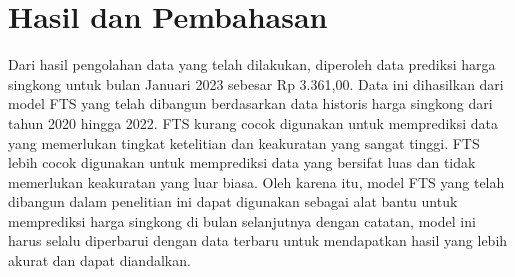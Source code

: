 \documentclass[conference]{IEEEtran}
\begin{document}
\section{Hasil dan Pembahasan}
Dari hasil pengolahan data yang telah dilakukan, diperoleh data prediksi harga singkong untuk bulan Januari 2023 sebesar Rp 3.361,00. Data ini dihasilkan dari model FTS yang telah dibangun berdasarkan data historis harga singkong dari tahun 2020 hingga 2022.
FTS kurang cocok digunakan untuk memprediksi data yang memerlukan tingkat ketelitian dan keakuratan yang sangat tinggi. FTS lebih cocok digunakan untuk memprediksi data yang bersifat luas dan tidak memerlukan keakuratan yang luar biasa. Oleh karena itu, model FTS yang telah dibangun dalam penelitian ini dapat digunakan sebagai alat bantu untuk memprediksi harga singkong di bulan selanjutnya dengan catatan, model ini harus selalu diperbarui dengan data terbaru untuk mendapatkan hasil yang lebih akurat dan dapat diandalkan.
\end{document}
